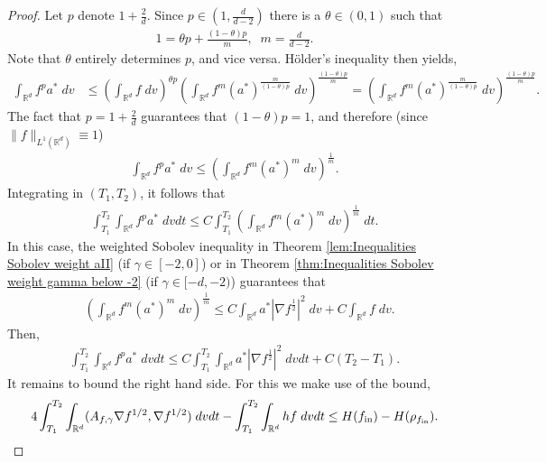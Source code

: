 \documentclass[12pt,american]{amsart}
\numberwithin{equation}{section}
\theoremstyle{plain}
\theoremstyle{definition}                  %
\def\fin{f_{\textnormal{in}}}
\begin{document}
\begin{proof}  
  Let $p$ denote $1+\frac{2}{d}$. Since  $p \in (1,\frac{d}{d-2})$ there is a $\theta \in (0,1)$ such that
  \begin{align*} 
    1 = \theta p + \frac{(1-\theta)p}{m},\;\; m = \frac{d}{d-2}.    
  \end{align*}	
  Note that $\theta$ entirely determines $p$, and vice versa. H\"older's inequality then yields,
  \begin{align*}
    \int_{\mathbb{R}^d}  f^p a^*\;dv & \leq \left ( \int_{\mathbb{R}^d} f \;dv \right )^{\theta p}	\left (\int_{\mathbb{R}^d} f^{m} (a^*)^{\frac{m}{(1-\theta)p}}\;dv \right )^{\frac{(1-\theta)p}{m}} = \left (\int_{\mathbb{R}^d} f^{m} (a^*)^{\frac{m}{(1-\theta)p}}\;dv \right )^{\frac{(1-\theta)p}{m}}.	  
  \end{align*}
  The fact that $p=1+\frac{2}{d}$ guarantees that $(1-\theta) p =1$, and therefore (since $\|f\|_{L^1(\mathbb{R}^d)}\equiv1$)
  \begin{align*}
    \int_{\mathbb{R}^d}  f^p a^*\;dv \leq \left ( \int_{\mathbb{R}^d} f^{m} (a^*)^{m}\;dv \right )^{\frac{1}{m}}.	  
  \end{align*}	  
  Integrating in $(T_1,T_2)$, it follows that
  \begin{align*}
    \int_{T_1}^{T_2}\int_{\mathbb{R}^d} f^pa^*\;dvdt \leq C \int_{T_1}^{T_2}\left ( \int_{\mathbb{R}^d} f^{m}(a^*)^{m} \;dv \right )^{\frac{1}{m}}\;dt.	  
  \end{align*}	  
  In this case, the weighted Sobolev inequality in Theorem \ref{lem:Inequalities Sobolev weight aII} (if $\gamma\in [-2,0]$) or in Theorem \ref{thm:Inequalities Sobolev weight gamma below -2} (if $\gamma\in [-d,-2)$) guarantees that
\begin{align*}
  & \left( \int_{\mathbb{R}^d} f^{m} (a^*)^{m} \;dv \right )^{\frac{1}{m}} \leq C\int_{\mathbb{R}^d} a^*|\nabla f^{\frac{1}{2}}|^2\;dv+C \int_{\mathbb{R}^d}f\;dv.
\end{align*}
  Then, 
 \begin{align*}
    \int_{T_1}^{T_2}\int_{\mathbb{R}^d}  f^p a^*\;dvdt \leq C \int_{T_1}^{T_2}\int_{\mathbb{R}^d} a^*|\nabla f^{\frac{1}{2}}|^2\;dvdt+C(T_2-T_1).
  \end{align*}
  It remains to bound the right hand side. For this we make use of the bound, 
  \begin{align*}
    4\int_{T_1}^{T_2}\int_{\mathbb{R}^d}(A_{f,\gamma}\nabla f^{1/2},\nabla f^{1/2})\;dvdt-\int_{T_1}^{T_2}\int_{\mathbb{R}^d}hf\;dvdt \leq H(\fin)-H(\rho_{\fin}).

\end{align*}
\end{proof}
\end{document}
